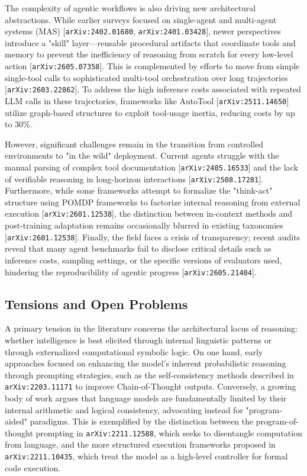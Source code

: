 \documentclass[11pt]{article}
\begin{document}
The complexity of agentic workflows is also driving new architectural abstractions. While earlier surveys focused on single-agent and multi-agent systems (MAS) [\texttt{arXiv:2402.01680}, \texttt{arXiv:2401.03428}], newer perspectives introduce a "skill" layer—reusable procedural artifacts that coordinate tools and memory to prevent the inefficiency of reasoning from scratch for every low-level action [\texttt{arXiv:2605.07358}]. This is complemented by efforts to move from simple single-tool calls to sophisticated multi-tool orchestration over long trajectories [\texttt{arXiv:2603.22862}]. To address the high inference costs associated with repeated LLM calls in these trajectories, frameworks like AutoTool [\texttt{arXiv:2511.14650}] utilize graph-based structures to exploit tool-usage inertia, reducing costs by up to 30\%.

However, significant challenges remain in the transition from controlled environments to "in the wild" deployment. Current agents struggle with the manual parsing of complex tool documentation [\texttt{arXiv:2405.16533}] and the lack of verifiable reasoning in long-horizon interactions [\texttt{arXiv:2508.17281}]. Furthermore, while some frameworks attempt to formalize the "think-act" structure using POMDP frameworks to factorize internal reasoning from external execution [\texttt{arXiv:2601.12538}], the distinction between in-context methods and post-training adaptation remains occasionally blurred in existing taxonomies [\texttt{arXiv:2601.12538}]. Finally, the field faces a crisis of transparency; recent audits reveal that many agent benchmarks fail to disclose critical details such as inference costs, sampling settings, or the specific versions of evaluators used, hindering the reproducibility of agentic progress [\texttt{arXiv:2605.21404}].

\subsection{Tensions and Open Problems}

A primary tension in the literature concerns the architectural locus of reasoning: whether intelligence is best elicited through internal linguistic patterns or through externalized computational symbolic logic. On one hand, early approaches focused on enhancing the model's inherent probabilistic reasoning through prompting strategies, such as the self-consistency methods described in \texttt{arXiv:2203.11171} to improve Chain-of-Thought outputs. Conversely, a growing body of work argues that language models are fundamentally limited by their internal arithmetic and logical consistency, advocating instead for "program-aided" paradigms. This is exemplified by the distinction between the program-of-thought prompting in \texttt{arXiv:2211.12588}, which seeks to disentangle computation from language, and the more structured execution frameworks proposed in \texttt{arXiv:2211.10435}, which treat the model as a high-level controller for formal code execution.
\end{document}
